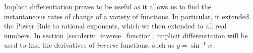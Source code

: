 Implicit differentiation proves to be useful as it allows us to find the instantaneous rates of change of a variety of functions. In particular, it extended the Power Rule to rational exponents, which we then extended to all real numbers. In section~\ref{sec:deriv_inverse_function}, implicit differentiation will be used to find the derivatives of \textit{inverse} functions, such as $y=\sin^{-1} x$.

%
%
%
%
%
%
%
%
%
%
%
